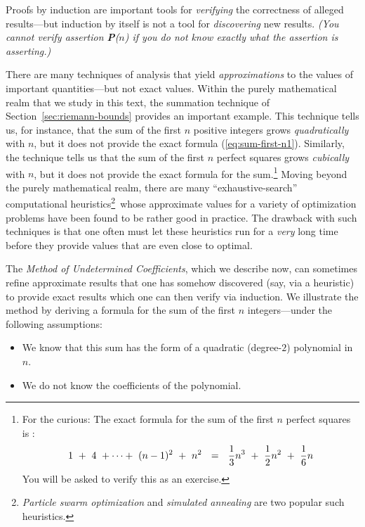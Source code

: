 Proofs by induction are important tools for {\em verifying} the correctness of alleged results---but induction by itself is not a tool for {\em discovering} new results.  {\em (You cannot {\em verify} assertion {\bf P}($n$) if you do not know {\em exactly} what the assertion is asserting.)}

\medskip


There are many techniques of analysis that yield {\em approximations} to the values of important quantities---but not exact values.  Within the purely mathematical realm that we study in this text, the summation technique of Section~\ref{sec:riemann-bounds} provides an important example.  This technique tells us, for instance, that the sum of the first $n$ positive integers grows {\em quadratically} with $n$, but it does not provide the exact formula (\ref{eq:sum-first-n1}).   Similarly, the technique tells us that the sum of the first $n$ perfect squares grows {\em cubically }with $n$, but it does not provide the exact formula for the sum.\footnote{For the curious:  The exact formula for the sum of the first $n$ perfect squares is :
\begin{equation}
\label{eq:sum-1-to-nsq1}
1 \ + \ 4 \ + \cdots + \ (n-1)^2 \ + \ n^2 
 \ \ = \ \
{1 \over 3} n^3 \ + \ {1 \over 2} n^2 \ + \ {1 \over 6} n
\end{equation}
You will be asked to verify this as an exercise.}
Moving beyond the purely mathematical realm, there are many ``exhaustive-search'' computational heuristics\footnote{{\it Particle swarm optimization} \cite{KennedyE95} and {\it simulated annealing} \cite{KirkpatrickGV83} are two popular such heuristics.}~whose approximate values for a variety of optimization problems have been found to be rather good in practice.  The drawback with such techniques is that one often must let these heuristics run for a {\em very} long time before they provide values that are even close to optimal.

\medskip


The {\em Method of Undetermined Coefficients}, which we describe now, can sometimes refine approximate results that one has somehow discovered (say, via a heuristic) to provide exact results which one can then verify via induction.  We illustrate the method by deriving a formula for the sum of the first $n$ integers---under the following assumptions:
\begin{itemize}
\item
We know that this sum has the form of a quadratic (degree-$2$) polynomial in $n$.
\item
We do not know the coefficients of the polynomial.
\end{itemize}

